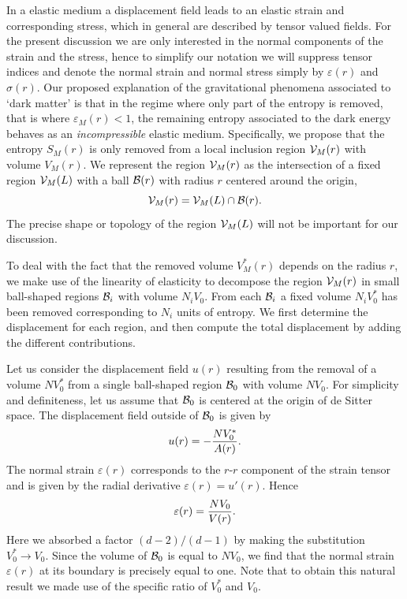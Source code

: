 \documentclass[a4paper,12pt]{article}
\begin{document}
In a elastic medium a displacement field leads to an elastic strain
and corresponding stress, which in general are described by tensor 
valued fields. For the present discussion we are only interested in 
the normal components of the strain and the stress, hence to simplify our notation we will suppress tensor indices and denote the normal strain and normal stress simply by $\varepsilon(r)$ and $\sigma(r)$. 
Our proposed explanation of the gravitational phenomena associated to `dark matter' is  that in the regime where only part of the entropy is removed, that is where $\varepsilon_M(r)\!<\!1$,  the remaining entropy associated to the dark energy behaves as an {\it incompressible} elastic 
 medium.    Specifically, we propose that the entropy $S_M(r)$ is only removed from a local inclusion region ${\cal V}_M(r)$ with volume $V_M(r)$.   We represent the region ${\cal V}_M(r)$ as the intersection of a fixed region ${\cal V}_M(L)$ with 
a ball ${\cal B} (r)$ with radius $r$ centered around the origin, 
 \begin{equation}
 {\cal V}_M(r) ={\cal V}_M(L)\cap {\cal B}(r).	
 \end{equation}
 The precise shape or topology of the region ${\cal V}_M(L)$ will not be important for our 
 discussion. 
 
To deal with the fact that the removed volume $V^*_M(r)$ depends on the radius $r$, 
 we make use of the linearity of elasticity to decompose the region ${\cal V}_M(r)$ in 
 small ball-shaped regions ${\cal B}_i$ with volume $N_iV_0$.  From each ${\cal B}_i$ a fixed volume $N_i V^*_0$ has been removed corresponding to $N_i$ units of entropy. We first determine the displacement for each region, and then compute the total displacement by adding the different contributions.  
  
 Let us consider the displacement field $u(r)$ resulting from the  removal of a volume $NV_0^*$ from a single ball-shaped region ${\cal B}_0$ with volume $NV_0$.  For simplicity and definiteness, let us assume that ${\cal B}_0$ is centered at the origin of de Sitter space.  The displacement field outside of ${\cal B}_0$ is given by
\begin{equation}
\label{u(r)0}
u(r) = -{NV_0^*\over A(r)}.	
\end{equation}
The normal strain $\varepsilon(r)$ corresponds to the $r$-$r$ component of the strain tensor and is given by the radial derivative $\varepsilon(r) = u'(r)$. Hence
\begin{equation}
\label{epsilon}
\varepsilon(r) = {NV_0\over V(r)} . 
\end{equation}
Here we absorbed a factor $(d-2)/(d-1)$ by making the substitution $V_0^* \to V_0$.  
Since the volume of ${\cal B}_0$ is equal to $NV_0$, we find that the normal strain $\varepsilon(r)$ at 
its boundary is precisely equal to one. Note that to obtain this natural result we made use of the specific ratio of $V_0^*$ and $V_0$. 
\end{document}
